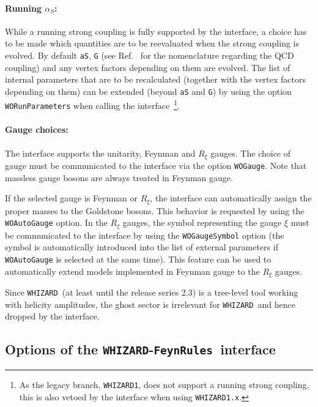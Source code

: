 \documentclass[12pt]{book}
\newcommand{\ttt}[1]{\texttt{#1}}
\newcommand{\whizard}{\ttt{WHIZARD}}
\newcommand{\FeynRules}{\ttt{FeynRules}}
\begin{document}
\paragraph{\bf Running $\alpha_S$:}

While a running strong coupling is fully supported by the interface, a
choice has to be made which quantities are to be reevaluated when the
strong coupling is evolved. By default \ttt{aS}, \ttt{G} (see
Ref.~\cite{Christensen:2008py} for the nomenclature regarding
the QCD coupling) and any vertex factors depending on them are evolved.
The list of internal parameters that are to be recalculated (together
with the vertex factors depending on them) can be
extended (beyond \ttt{aS} and \ttt{G}) by using
the option \ttt{WORunParameters} when calling the
interface~\footnote{As the legacy branch, \whizard\ttt{1}, does not
  support a running strong coupling, this is also vetoed by the
  interface when using \whizard \ttt{1.x}.}.

\paragraph{\bf Gauge choices:}
\label{sec:gauge-choices}

The interface supports the unitarity, Feynman and $R_\xi$ gauges. The choice of
gauge must be communicated to the interface via the option \ttt{WOGauge}.
Note that massless gauge bosons are always treated in Feynman gauge.

If the selected gauge is Feynman or $R_\xi$, the interface can
automatically assign the proper masses to the Goldstone bosons. This behavior is
requested by using the \ttt{WOAutoGauge} option. In the $R_\xi$
gauges, the symbol representing the gauge $\xi$ must be communicated to the
interface by using the \ttt{WOGaugeSymbol} option (the symbol is
automatically introduced into the list of external
parameters if \ttt{WOAutoGauge} is
selected at the same time). This feature can be used to automatically extend
models implemented in Feynman gauge to the $R_\xi$ gauges.

Since \whizard\ (at least until the release series 2.3) is a
tree-level tool working with helicity amplitudes, the ghost sector is
irrelevant for \whizard\ and hence dropped by the interface.

\subsection{Options of the \whizard-\FeynRules\ interface}
\label{app:interface-options}
\end{document}
